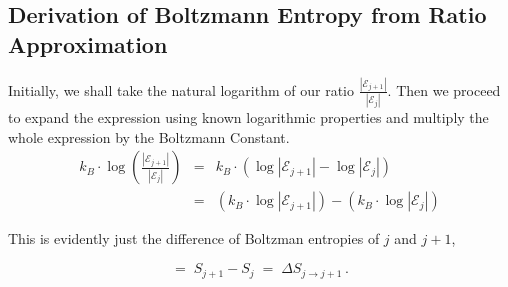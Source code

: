 \documentclass[journal=mamobx,manuscript=article]{achemso}
\begin{document}
\subsection{Derivation of Boltzmann Entropy from Ratio Approximation}

Initially, we shall take the natural logarithm of our ratio $\frac{|\mathcal{E}_{j+1}|}{|\mathcal{E}_{j}|}$. Then we proceed to expand the expression using known logarithmic properties and multiply the whole expression by the Boltzmann Constant.
\begin{eqnarray*}
k_B\cdot \log\left(\frac{|\mathcal{E}_{j+1}|}{|\mathcal{E}_{j}|}\right)  & = & 
k_B\cdot\left(\log\left|\mathcal{E}_{j+1}\right|-\log\left|\mathcal{E}_{j}\right|\right)  \\
&= & \left(k_B\cdot \log\left|\mathcal{E}_{j+1}\right|\right)-\left(k_B\cdot \log\left|\mathcal{E}_{j}\right|\right)
\end{eqnarray*}

\noindent This is evidently just the difference of Boltzman entropies of $j$ and $j+1$,

$$ =\; S_{j+1}-S_{j}\;=\; \Delta S_{j\to j+1} \,.$$





\end{document}
